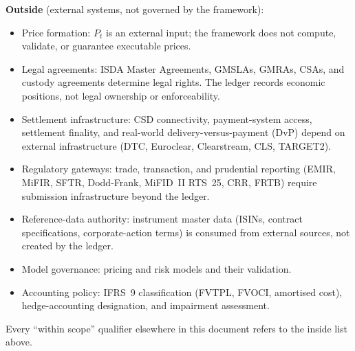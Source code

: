 \medskip
\noindent\textbf{Outside} (external systems, not governed by the framework):
\begin{itemize}[nosep]
\item Price formation: $P_t$ is an external input; the framework does not compute, validate, or guarantee executable prices.
\item Legal agreements: ISDA Master Agreements, GMSLAs, GMRAs, CSAs, and custody agreements determine legal rights. The ledger records economic positions, not legal ownership or enforceability.
\item Settlement infrastructure: CSD connectivity, payment-system access, settlement finality, and real-world delivery-versus-payment (DvP) depend on external infrastructure (DTC, Euroclear, Clearstream, CLS, TARGET2).
\item Regulatory gateways: trade, transaction, and prudential reporting (EMIR, MiFIR, SFTR, Dodd-Frank, MiFID~II RTS~25, CRR, FRTB) require submission infrastructure beyond the ledger.
\item Reference-data authority: instrument master data (ISINs, contract specifications, corporate-action terms) is consumed from external sources, not created by the ledger.
\item Model governance: pricing and risk models and their validation.
\item Accounting policy: IFRS~9 classification (FVTPL, FVOCI, amortised cost), hedge-accounting designation, and impairment assessment.
\end{itemize}

\noindent Every ``within scope'' qualifier elsewhere in this document refers to the inside list above.
